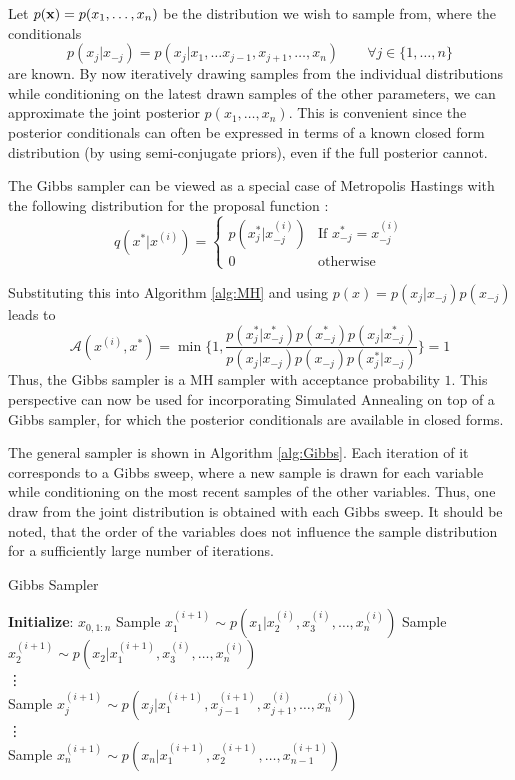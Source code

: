 Let $p(\mathbf{x}) = p(x_1, \dots, x_n)$ be the distribution we wish to sample from,
where the conditionals $$p(x_j|x_{-j}) = p(x_j | x_1, \dots x_{j-1}, x_{j+1}, \dots, x_n) \quad \quad \forall j \in \{1,\dots,n\}$$ are known.
By now iteratively drawing samples from the individual distributions while conditioning on the latest drawn samples of the other parameters, we can approximate the joint posterior $p(x_1,\dots,x_n)$.
This is convenient since the posterior conditionals can often be expressed in terms of a known closed form distribution (by using semi-conjugate priors), even if the full posterior cannot.

The Gibbs sampler can be viewed as a special case of Metropolis Hastings with the following distribution for the proposal function \citep{andrieu2003introduction}:
$$
q(x^*|x^{(i)}) = 
\left\{
\begin{array}{ll}
	p(x^*_j|x^{(i)}_{-j}) & \text{If } x^*_{-j} = x^{(i)}_{-j} 
	\\
	0                     & \text{otherwise}                   
\end{array}
\right.
$$

Substituting this into Algorithm \autoref{alg:MH} and using $p(x) = p(x_j|x_{-j}) p(x_{-j})$
leads to \cite[p. 544]{Bishop:2006:PRM:1162264}
$$
\mathcal{A}(x^{(i)}, x^*) = 
\min 
\Big\{ 
1, \frac{ p(x^*_j|x^*_{-j}) p(x^*_{-j}) p(x_j|x^*_{-j})}
{  p(x_j|x_{-j}) p(x_{-j}) p(x^*_j | x_{-j})  } 
\Big\} 
= 1
$$
Thus, the Gibbs sampler is a \gls{MH} sampler with acceptance probability $1$.
This perspective can now be used for incorporating Simulated Annealing on top of a Gibbs sampler, for which the posterior conditionals are available in closed forms.

The general sampler is shown in Algorithm \autoref{alg:Gibbs}.
Each iteration of it corresponds to a Gibbs sweep, where a new sample is drawn for each variable while conditioning on the most recent samples of the other variables.
Thus,  one draw from the joint distribution is obtained with each Gibbs sweep.
It should be noted, that the order of the variables does not influence the sample distribution for a sufficiently large number of iterations.
\begin{algorithm}[H]
	\caption{Gibbs Sampler}\label{alg:Gibbs}
	\begin{algorithmic}
		\State \textbf{Initialize}: $x_{0, 1:n}$
		\State Sample $x_1^{(i+1)}\sim p(x_1|x_2^{(i)}, x_3^{(i)}, \dots, x_n^{(i)})  $
		\State Sample $x_2^{(i+1)}\sim p(x_2|x_1^{(i+1)}, x_3^{(i)}, \dots, x_n^{(i)})  $
		\\
		\State \vdots
		\\
		\State Sample $x_j^{(i+1)}\sim p(x_j|x_1^{(i+1)}, x_{j-1}^{(i+1)},x_{j+1}^{(i)}, \dots, x_n^{(i)})  $
		\\
		\State \vdots
		\\
		\State Sample $x_n^{(i+1)}\sim p(x_n|x_1^{(i+1)}, x_2^{(i+1)}, \dots, x_{n-1}^{(i+1)})  $
		\EndFor
	\end{algorithmic}
\end{algorithm}

